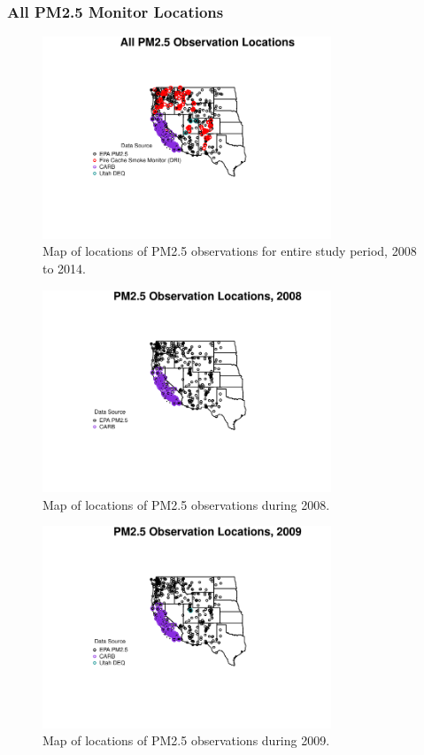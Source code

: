
\subsubsection*{All PM2.5 Monitor Locations}
\begin{figure} 
\centering 
\includegraphics[width=0.77\textwidth]{Code_Outputs/MapPM25_All_Sitesplot_year0.pdf} 
\caption{\label{fig:MapPM25Loc0}Map of locations of PM2.5 observations for entire study period, 2008 to 2014.} 
\end{figure} 
 

\begin{figure} 
\centering 
\includegraphics[width=0.77\textwidth]{Code_Outputs/MonitorLocationsByYear/MapPM25_All_Sitesplot_year2008.pdf} 
\caption{\label{fig:MapPM25Loc2008}Map of locations of PM2.5 observations during 2008.} 
\end{figure} 
 

\begin{figure} 
\centering 
\includegraphics[width=0.77\textwidth]{Code_Outputs/MonitorLocationsByYear/MapPM25_All_Sitesplot_year2009.pdf} 
\caption{\label{fig:MapPM25Loc2009}Map of locations of PM2.5 observations during 2009.} 
\end{figure} 
 

